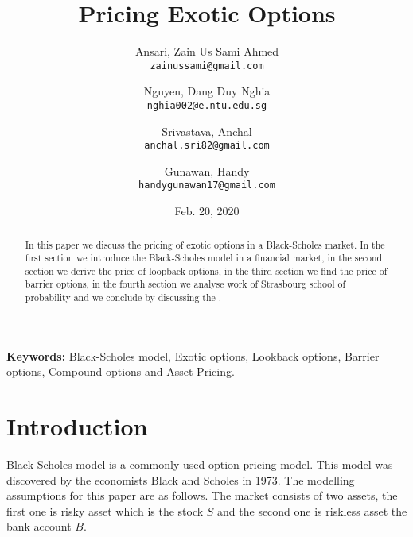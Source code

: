 \documentclass{article}
\begin{document}
\nocite{*} %

\title{Pricing Exotic Options}

\author{
  Ansari, Zain Us Sami Ahmed\\
  \texttt{zainussami@gmail.com}
  \and
  Nguyen, Dang Duy Nghia \\
  \texttt{nghia002@e.ntu.edu.sg}  
    \and
  Srivastava, Anchal \\
  \texttt{anchal.sri82@gmail.com}  
        \and
  Gunawan, Handy \\
  \texttt{handygunawan17@gmail.com}  
}

\date{Feb. 20, 2020} %

\maketitle

\noindent
\textbf{Keywords:} Black-Scholes model, Exotic options,  Lookback options, Barrier options, Compound options
 and Asset Pricing.



\begin{abstract}
In this paper we discuss the pricing of exotic options in a Black-Scholes market.  In the first section we introduce the Black-Scholes model in a financial market, in the second section we derive the price of loopback options, in the third section we find the price of barrier options,  in the fourth section we analyse work of Strasbourg school of probability and we conclude by discussing the .  
\end{abstract}

\section{Introduction
}

Black-Scholes model is a commonly used option pricing model. This model was discovered by the economists Black and Scholes \cite{BS1} in 1973.  The modelling assumptions for this paper are as follows.  The market consists of two assets, the first one is risky asset which is the stock $S$ and the second one is riskless asset the bank account $B$. \\
\end{document}
